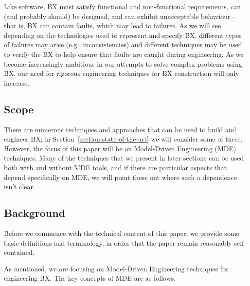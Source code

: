 Like software, BX must satisfy functional and non-functional requirements, can (and probably should) be designed, and can exhibit unacceptable behaviour -- that is, BX can contain faults, which may lead to failures. As we will see, depending on the technologies used to represent and specify BX, different types of failures may arise (e.g., inconsistencies) and different techniques may be used to verify the BX to help ensure that faults are caught during engineering. As we become increasingly ambitious in our attempts to solve complex problems using BX, our need for rigorous engineering techniques for BX construction will only increase.

\subsection{Scope}
There are numerous techniques and approaches that can be used to build and engineer BX; in Section~\ref{section:state-of-the-art} we will consider some of these. However, the focus of this paper will be on Model-Driven Engineering (MDE) techniques. Many of the techniques that we present in later sections can be used both with and without MDE tools, and if there are particular aspects that depend specifically on MDE, we will point these out where such a dependence isn't clear.

\subsection{Background}
Before we commence with the technical content of this paper, we provide some basic definitions and terminology, in order that the paper remain reasonably self-contained.

As mentioned, we are focusing on Model-Driven Engineering techniques for engineering BX. The key concepts of MDE are as follows.

